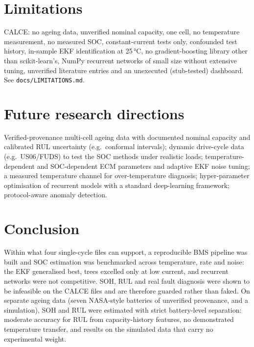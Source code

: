 \section{Limitations}
CALCE: no ageing data, unverified nominal capacity, one cell, no temperature measurement, no measured SOC, constant-current tests only, confounded test history, in-sample EKF identification at 25\,°C, no gradient-boosting library other than scikit-learn's, NumPy recurrent networks of small size without extensive tuning, unverified literature entries and an unexecuted (stub-tested) dashboard. See \texttt{docs/LIMITATIONS.md}.
\section{Future research directions}
Verified-provenance multi-cell ageing data with documented nominal capacity and calibrated RUL uncertainty (e.g.\ conformal intervals); dynamic drive-cycle data (e.g.\ US06/FUDS) to test the SOC methods under realistic loads; temperature-dependent and SOC-dependent ECM parameters and adaptive EKF noise tuning; a measured temperature channel for over-temperature diagnosis; hyper-parameter optimisation of recurrent models with a standard deep-learning framework; protocol-aware anomaly detection.
\section{Conclusion}
Within what four single-cycle files can support, a reproducible BMS pipeline was built and SOC estimation was benchmarked across temperature, rate and noise: the EKF generalised best, trees excelled only at low current, and recurrent networks were not competitive. SOH, RUL and real fault diagnosis were shown to be infeasible on the CALCE files and are therefore guarded rather than faked. On separate ageing data (seven NASA-style batteries of unverified provenance, and a simulation), SOH and RUL were estimated with strict battery-level separation: moderate accuracy for RUL from capacity-history features, no demonstrated temperature transfer, and results on the simulated data that carry no experimental weight.
